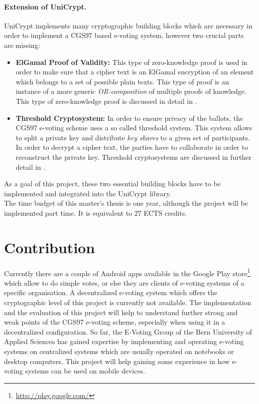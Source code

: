 \documentclass[numbers=noenddot, abstract=on, a4paper, headsepline,
footsepline, oneside, openright, draft=off, listof=leveldown]{scrreprt}
\begin{document}
\paragraph{Extension of UniCrypt.}
UniCrypt implements many cryptographic building blocks which are necessary in
order to implement a CGS97 based e-voting system, however two crucial parts are
missing:
\begin{itemize}
  \item \textbf{ElGamal Proof of Validity:} This type of zero-knowledge proof is
  used in order to make sure that a cipher text is an ElGamal encryption of an
  element which belongs to a set of possible plain texts. This type of proof is
  an instance	 of a more generic \emph{OR-composition} of multiple proofs of
  knowledge. This type of zero-knowledge proof is discussed in detail in
  .
  \item \textbf{Threshold Cryptosystem:} In order to ensure privacy of
  the ballots, the CGS97 e-voting scheme uses a so called threshold system. This
  system allows to split a private key and distribute \emph{key shares} to a
  given set of participants. In order to decrypt a cipher text, the parties have
  to collaborate in order to reconstruct the private key. Threshold cryptosystems
  are discussed in further detail in .
\end{itemize}

As a goal of this project, these two essential building blocks have to be
implemented and integrated into the UniCrypt library.
\\

The time budget of this master's thesis is one year, although the project will
be implemented part time. It is equivalent to 27 ECTS credits.

\section{Contribution}
\label{sec:contribution}
Currently there are a couple of Android apps available in the Google Play
store\footnote{\url{http://play.google.com/}} which allow to do simple votes, or
else they are clients of e-voting systems of a specific organisation. A
decentralized e-voting system which offers the cryptographic level of this
project is currently not available. The implementation and the evaluation of
this project will help to understand further strong and weak points of the CGS97
e-voting scheme, especially when using it in a decentralized configuration. So
far, the E-Voting Group of the Bern University of Applied Sciences has gained
expertise by implementing and operating e-voting systems on centralized systems
which are usually operated on notebooks or desktop computers. This project will
help gaining some experience in how e-voting systems can be used on mobile
devices.
\end{document}
